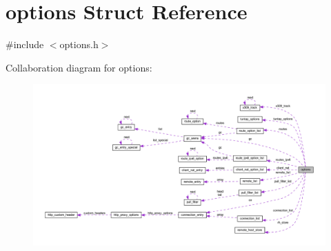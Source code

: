 \hypertarget{structoptions}{}\section{options Struct Reference}
\label{structoptions}


{\ttfamily \#include $<$options.\+h$>$}



Collaboration diagram for options\+:
\nopagebreak
\begin{figure}[H]
\begin{center}
\leavevmode
\includegraphics[width=350pt]{structoptions__coll__graph}
\end{center}
\end{figure}
